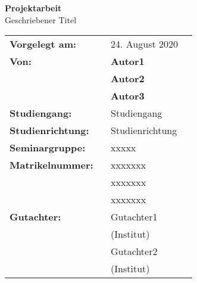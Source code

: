 
\begin{titlepage}
\begin{center}

\textbf{\Huge Projektarbeit}\\
\vspace{1.5cm}
\LARGE{Geschriebener Titel \\}
\vspace{1.5cm}
\end{center}
\begin{flushleft}
\large{
\begin{tabular}{l l r}
\vspace{1.0cm}
\textbf{Vorgelegt am:}\quad\quad\quad & 24. August 2020\\

\textbf{Von:}           ~ & \textbf{Autor1}\\
                        ~ & \textbf{Autor2}\\
\vspace{1.0cm}
                        ~ & \textbf{Autor3}\\

\textbf{Studiengang:}   ~ & Studiengang \\
\vspace{1.0cm}
\textbf{Studienrichtung:} ~ & Studienrichtung \\
\vspace{1.0cm}
\textbf{Seminargruppe:} ~ & xxxxx \\

\textbf{Matrikelnummer:} ~ & xxxxxxx \\
                         ~ & xxxxxxx \\
\vspace{1.0cm}
                         ~ & xxxxxxx \\
\textbf{Gutachter:}     ~ & Gutachter1 \\ ~ & (Institut)\\
                        ~ & Gutachter2 \\ ~ & (Institut)\\
                        
\end{tabular}}
\end{flushleft}
\end{titlepage}
\newpage
